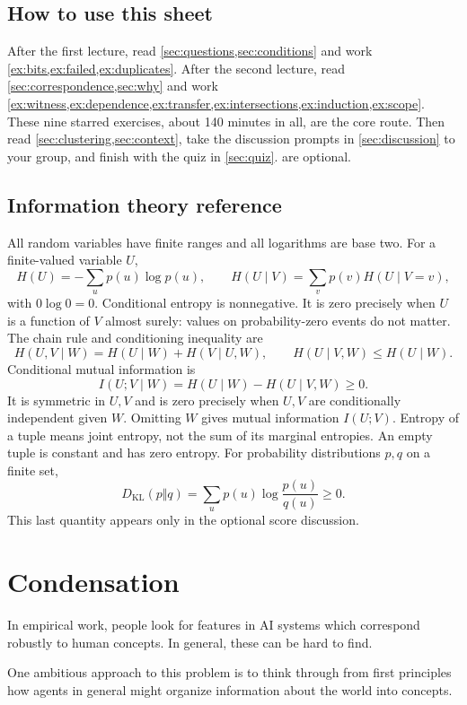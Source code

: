 \documentclass[11pt]{article}
\begin{document}
\subsection*{How to use this sheet}
After the first lecture, read \cref{sec:questions,sec:conditions} and work
\cref{ex:bits,ex:failed,ex:duplicates}. After the second lecture, read
\cref{sec:correspondence,sec:why} and work
\cref{ex:witness,ex:dependence,ex:transfer,ex:intersections,ex:induction,ex:scope}.
These nine starred exercises, about 140 minutes in all, are the core route.
Then read \cref{sec:clustering,sec:context}, take the discussion prompts in
\cref{sec:discussion} to your group, and finish with the quiz in
\cref{sec:quiz}. 
are optional.

\subsection{Information theory reference}
\label{sec:it-reference}
All random variables have finite ranges and all logarithms are base two.
For a finite-valued variable $U$,
\[
 H(U)=-\sum_u p(u)\log p(u),\qquad
 H(U\mid V)=\sum_v p(v)H(U\mid V=v),
\]
with $0\log 0=0$. Conditional entropy is nonnegative. It is zero precisely when
$U$ is a function of $V$ almost surely: values on probability-zero events do not
matter. The chain rule and conditioning inequality are
\[
 H(U,V\mid W)=H(U\mid W)+H(V\mid U,W),\qquad
 H(U\mid V,W)\le H(U\mid W).
\]
Conditional mutual information is
\[
 I(U;V\mid W)=H(U\mid W)-H(U\mid V,W)\ge0.
\]
It is symmetric in $U,V$ and is zero precisely when $U,V$ are conditionally
independent given $W$. Omitting $W$ gives mutual information $I(U;V)$.
Entropy of a tuple means joint entropy, not the sum of its marginal entropies.
An empty tuple is constant and has zero entropy.
For probability distributions $p,q$ on a finite set,
\[
 D_{\mathrm{KL}}(p\Vert q)=\sum_u p(u)\log\frac{p(u)}{q(u)}\ge0.
\]
This last quantity appears only in the optional score discussion.

\section{Condensation}
In empirical work, people look for features in AI systems which correspond
robustly to human concepts. In general, these can be hard to find.

One ambitious approach to this problem is to think through from first
principles how agents in general might organize information about the world
into concepts.
\end{document}

